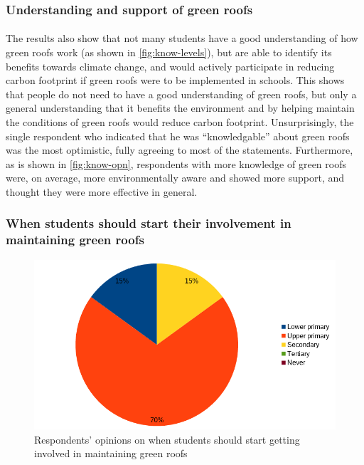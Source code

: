 \documentclass[a4paper]{article}
\begin{document}
\begin{multicols}{2}
  \subsubsection{Understanding and support of green roofs}

  \paragraph{} The results also show that not many students
  have a good understanding of how green roofs work (as shown in
  \cref{fig:know-levels}), but are able to identify its benefits towards
  climate change, and would actively participate in reducing carbon
  footprint if green roofs were to be implemented in schools. This shows
  that people do not need to have a good understanding of green roofs,
  but only a general understanding that it benefits the environment and
  by helping maintain the conditions of green roofs would reduce carbon
  footprint. Unsurprisingly, the single respondent who indicated that
  he was ``knowledgable'' about green roofs was the most optimistic,
  fully agreeing to most of the statements. Furthermore, as is shown in
  \cref{fig:know-opn}, respondents with more knowledge of green roofs
  were, on average, more environmentally aware and showed more support,
  and thought they were more effective in general.

  \subsubsection{
    When students should start their involvement in maintaining green
    roofs
  }

  \begin{figure}[H]
    \centering
    \includegraphics[width=\linewidth]{level.png}
    \caption{
      Respondents' opinions on when students should start getting involved
      in maintaining green roofs
    }
    \label{fig:levels}
  \end{figure}


\end{multicols}
\end{document}
